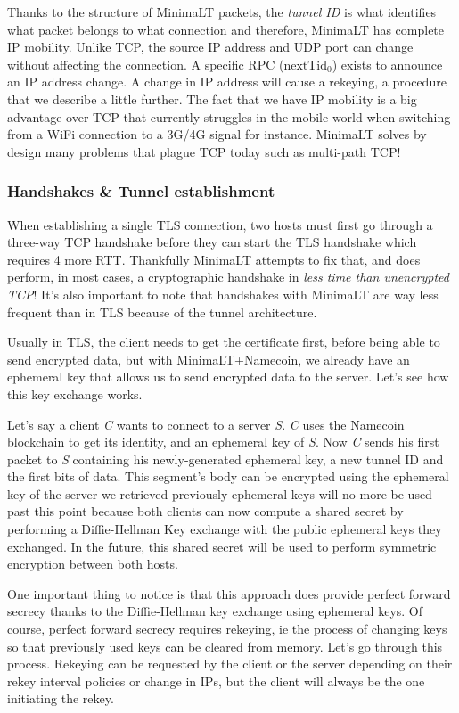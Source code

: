 \documentclass{vldb}
\begin{document}
Thanks to the structure of MinimaLT packets, the \emph{tunnel ID} is what identifies what packet belongs to what connection and therefore, MinimaLT has complete IP mobility. Unlike TCP, the source IP address and UDP port can change without affecting the connection. A specific RPC (\emph{$\text{nextTid}_{0}$}) exists to announce an IP address change. A change in IP address will cause a rekeying, a procedure that we describe a little further. The fact that we have IP mobility is a big advantage over TCP that currently struggles in the mobile world when switching from a WiFi connection to a 3G/4G signal for instance. MinimaLT solves by design many problems that plague TCP today such as multi-path TCP!

\subsubsection{Handshakes \& Tunnel establishment}

When establishing a single TLS connection, two hosts must first go through a three-way TCP  handshake before they can start the TLS handshake which requires 4 more RTT. Thankfully MinimaLT attempts to fix that, and does perform, in most cases, a cryptographic handshake in \emph{less time than unencrypted TCP}! It's also important to note that handshakes with MinimaLT are way less frequent than in TLS because of the tunnel architecture.

Usually in TLS, the client needs to get the certificate first, before being able to send encrypted data, but with MinimaLT+Namecoin, we already have an ephemeral key that allows us to send encrypted data to the server. Let's see how this key exchange works.

Let's say a client \emph{C} wants to connect to a server \emph{S}. \emph{C} uses the Namecoin blockchain to get its identity, and an ephemeral key of \emph{S}. Now \emph{C} sends his first packet to \emph{S} containing his newly-generated ephemeral key, a new tunnel ID and the first bits of data. This segment's body can be encrypted using the ephemeral key of the server we retrieved previously ephemeral keys will no more be used past this point because both clients can now compute a shared secret by performing a Diffie-Hellman Key exchange with the public ephemeral keys they exchanged. In the future, this shared secret will be used to perform symmetric encryption between both hosts.

One important thing to notice is that this approach does provide perfect forward secrecy thanks to the Diffie-Hellman key exchange using ephemeral keys. Of course, perfect forward secrecy requires rekeying, ie the process of changing keys so that previously used keys can be cleared from memory. Let's go through this process. Rekeying can be requested by the client or the server depending on their rekey interval policies or change in IPs, but the client will always be the one initiating the rekey.
\end{document}
